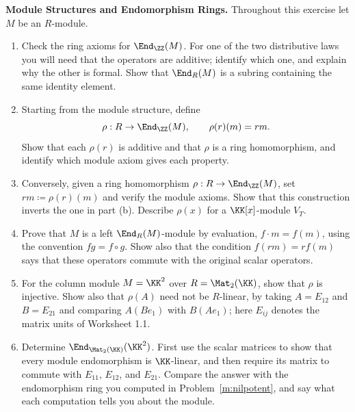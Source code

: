 \documentclass[12pt,reqno]{amsart}
\begin{document}
\begin{problems}
\item\label{m:end} \textbf{Module Structures and Endomorphism Rings.} Throughout this exercise let $M$ be an $R$-module.
\begin{enumerate}
\item Check the ring axioms for $\End_{\ZZ}(M)$. For one of the two distributive laws you will need that the operators are additive; identify which one, and explain why the other is formal. Show that $\End_R(M)$ is a subring containing the same identity element.
\item Starting from the module structure, define
\[
 \rho:R\to\End_{\ZZ}(M),\qquad \rho(r)(m)=rm.
\]
Show that each $\rho(r)$ is additive and that $\rho$ is a ring homomorphism, and identify which module axiom gives each property.
\item Conversely, given a ring homomorphism $\rho:R\to\End_{\ZZ}(M)$, set $rm\coloneqq\rho(r)(m)$ and verify the module axioms. Show that this construction inverts the one in part (b). Describe $\rho(x)$ for a $\KK[x]$-module $V_T$.
\item Prove that $M$ is a left $\End_R(M)$-module by evaluation, $f\cdot m=f(m)$, using the convention $fg=f\circ g$. Show also that the condition $f(rm)=rf(m)$ says that these operators commute with the original scalar operators.
\item For the column module $M=\KK^2$ over $R=\Mat_2(\KK)$, show that $\rho$ is injective. Show also that $\rho(A)$ need not be $R$-linear, by taking $A=E_{12}$ and $B=E_{21}$ and comparing $A(Be_1)$ with $B(Ae_1)$; here $E_{ij}$ denotes the matrix units of Worksheet 1.1.
\item Determine $\End_{\Mat_2(\KK)}(\KK^2)$. First use the scalar matrices to show that every module endomorphism is $\KK$-linear, and then require its matrix to commute with $E_{11}$, $E_{12}$, and $E_{21}$. Compare the answer with the endomorphism ring you computed in Problem~\ref{m:nilpotent}, and say what each computation tells you about the module.
\end{enumerate}
\end{problems}

\hrulefill
\end{document}
